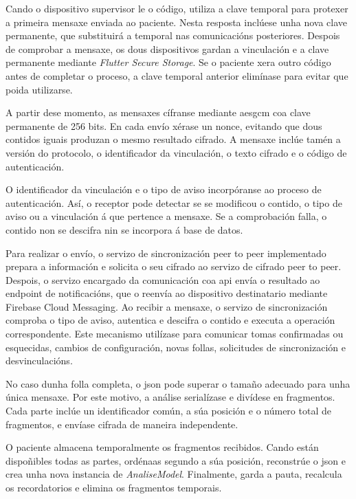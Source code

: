 Cando o dispositivo supervisor le o código, utiliza a clave temporal para protexer a primeira mensaxe enviada ao paciente. Nesta resposta inclúese unha nova clave permanente, que substituirá a temporal nas comunicacións posteriores. Despois de comprobar a mensaxe, os dous dispositivos gardan a vinculación e a clave permanente mediante \textit{Flutter Secure Storage}. Se o paciente xera outro código antes de completar o proceso, a clave temporal anterior elimínase para evitar que poida utilizarse.

A partir dese momento, as mensaxes cífranse mediante \gls{aesgcm} coa clave permanente de 256 bits. En cada envío xérase un \gls{nonce}, evitando que dous contidos iguais produzan o mesmo resultado cifrado. A mensaxe inclúe tamén a versión do protocolo, o identificador da vinculación, o texto cifrado e o código de autenticación.

O identificador da vinculación e o tipo de aviso incorpóranse ao proceso de autenticación. Así, o receptor pode detectar se se modificou o contido, o tipo de aviso ou a vinculación á que pertence a mensaxe. Se a comprobación falla, o contido non se descifra nin se incorpora á base de datos.

Para realizar o envío, o servizo de sincronización peer to peer implementado prepara a información e solicita o seu cifrado ao servizo de cifrado peer to peer. Despois, o servizo encargado da comunicación coa \gls{api} envía o resultado ao endpoint de notificacións, que o reenvía ao dispositivo destinatario mediante Firebase Cloud Messaging. Ao recibir a mensaxe, o servizo de sincronización comproba o tipo de aviso, autentica e descifra o contido e executa a operación correspondente. Este mecanismo utilízase para comunicar tomas confirmadas ou esquecidas, cambios de configuración, novas follas, solicitudes de sincronización e desvinculacións.

No caso dunha folla completa, o \gls{json} pode superar o tamaño adecuado para unha única mensaxe. Por este motivo, a análise serialízase e divídese en fragmentos. Cada parte inclúe un identificador común, a súa posición e o número total de fragmentos, e envíase cifrada de maneira independente.

O paciente almacena temporalmente os fragmentos recibidos. Cando están dispoñibles todas as partes, ordénaas segundo a súa posición, reconstrúe o \gls{json} e crea unha nova instancia de \textit{AnaliseModel}. Finalmente, garda a pauta, recalcula os recordatorios e elimina os fragmentos temporais.


